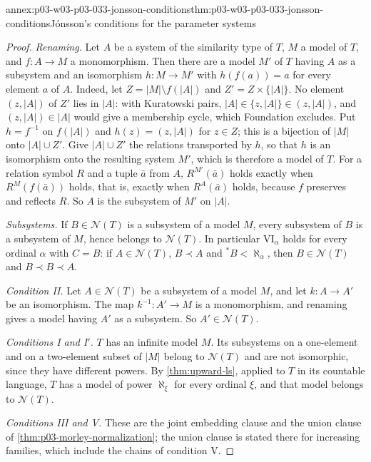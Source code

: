 \begin{annexitem}{annex:p03-w03-p03-033-jonsson-conditions}{thm:p03-w03-p03-033-jonsson-conditions}{Jónsson's conditions for the parameter systems}
\begin{proof}
\emph{Renaming.} Let \(A\) be a system of the similarity type of \(T\),
\(M\) a model of \(T\), and \(f:A\to M\) a monomorphism. Then there are a
model \(M'\) of \(T\) having \(A\) as a subsystem and an isomorphism
\(h:M\to M'\) with \(h(f(a))=a\) for every element \(a\) of \(A\). Indeed,
let \(Z=|M|\setminus f(|A|)\) and \(Z'=Z\times\{|A|\}\). No element
\((z,|A|)\) of \(Z'\) lies in \(|A|\): with Kuratowski pairs,
\(|A|\in\{z,|A|\}\in(z,|A|)\), and \((z,|A|)\in|A|\) would give a
membership cycle, which Foundation excludes. Put \(h=f^{-1}\) on
\(f(|A|)\) and \(h(z)=(z,|A|)\) for \(z\in Z\); this is a bijection of
\(|M|\) onto \(|A|\cup Z'\). Give \(|A|\cup Z'\) the relations
transported by \(h\), so that \(h\) is an isomorphism onto the resulting
system \(M'\), which is therefore a model of \(T\). For a relation symbol
\(R\) and a tuple \(\bar a\) from \(A\), \(R^{M'}(\bar a)\) holds exactly
when \(R^M(f(\bar a))\) holds, that is, exactly when \(R^A(\bar a)\)
holds, because \(f\) preserves and reflects \(R\). So \(A\) is the
subsystem of \(M'\) on \(|A|\).

\emph{Subsystems.} If \(B\in\mathcal N(T)\) is a subsystem of a model
\(M\), every subsystem of \(B\) is a subsystem of \(M\), hence belongs to
\(\mathcal N(T)\). In particular VI\(_\alpha\) holds for every ordinal
\(\alpha\) with \(C=B\): if \(A\in\mathcal N(T)\), \(B\prec A\) and
\(^*B<\aleph_\alpha\), then \(B\in\mathcal N(T)\) and
\(B\prec B\prec A\).

\emph{Condition II.} Let \(A\in\mathcal N(T)\) be a subsystem of a model
\(M\), and let \(k:A\to A'\) be an isomorphism. The map
\(k^{-1}:A'\to M\) is a monomorphism, and renaming gives a model having
\(A'\) as a subsystem. So \(A'\in\mathcal N(T)\).

\emph{Conditions I and I\('\).} \(T\) has an infinite model \(M\). Its
subsystems on a one-element and on a two-element subset of \(|M|\) belong
to \(\mathcal N(T)\) and are not isomorphic, since they have different
powers. By \cref{thm:upward-ls}, applied to \(T\) in its countable
language, \(T\) has a model of power \(\aleph_\xi\) for every ordinal
\(\xi\), and that model belongs to \(\mathcal N(T)\).

\emph{Conditions III and V.} These are the joint embedding clause and the
union clause of \cref{thm:p03-morley-normalization}; the union clause is
stated there for increasing families, which include the chains of
condition V.


\end{proof}
\end{annexitem}
